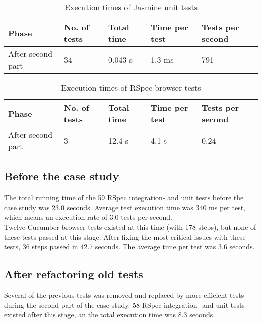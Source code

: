 \begin{table}[t]
    \centering
    \begin{tabular}{l l l l l}
        Phase & No. of tests & Total time & Time per test & Tests per second \\
        \hline
        After second part & 34 &  0.043 s & 1.3 ms & 791\\
    \end{tabular}
    \caption{ Execution times of Jasmine unit tests }
    \label{tab:jasmine_times}
\end{table}

\begin{table}[t]
    \centering
    \begin{tabular}{l l l l l}
        Phase & No. of tests & Total time & Time per test & Tests per second \\
        \hline
        After second part & 3 &  12.4 s & 4.1 s & 0.24\\
    \end{tabular}
    \caption{ Execution times of RSpec browser tests }
    \label{tab:rspec_browser_times}
\end{table}


\subsection{Before the case study}

The total running time of the 59 RSpec integration- and unit tests
before the case study was 23.0 seconds. Average test execution time was
340 ms per test, which means an execution rate of 3.0 tests per
second.\\

Twelve Cucumber browser tests existed at this time (with 178 steps), but
none of these tests passed at this stage. After fixing the most critical
issues with these tests, 36 steps passed in 42.7 seconds. The average
time per test was 3.6 seconds.\\


\subsection{After refactoring old tests}

Several of the previous tests was removed and replaced by more efficient
tests during the second part of the case study. 58 RSpec integration-
and unit tests existed after this stage, an the total execution time was
8.3 seconds.\\

